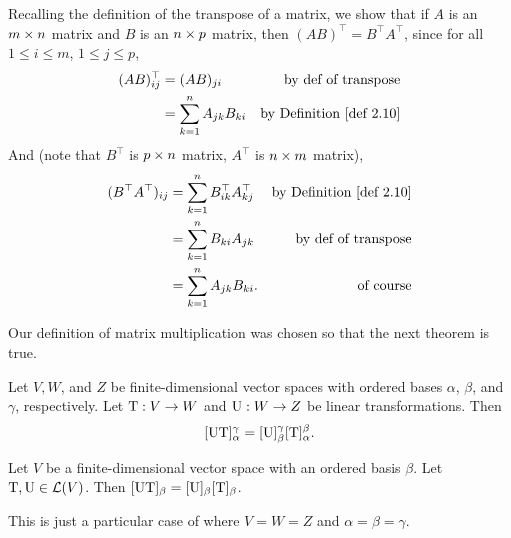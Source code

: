 \begin{additional theorem} \label{athm 2.24}
Recalling the definition of the transpose of a matrix, we show that if \(A\) is an \(m \times n\) matrix and \(B\) is an \(n \times p\) matrix, then \((AB)^\top = B^\top A^\top\), since for all \(1 \le i \le m\), \(1 \le j \le p\),
\begin{align*}
    (AB)^\top_{ij} & = (AB)_{ji} & \text{by def of transpose} \\
                   & = \sum_{k = 1}^n A_{jk} B_{ki} & \text{by \DEF{2.10}}
\end{align*}
And (note that \(B^\top\) is \(p \times n\) matrix, \(A^\top\) is \(n \times m\) matrix),
\begin{align*}
    (B^\top A^\top)_{ij} & = \sum_{k = 1}^n B^\top_{ik} A^\top_{kj} & \text{by \DEF{2.10}} \\
                         & = \sum_{k = 1}^n B_{ki} A_{jk} & \text{by def of transpose} \\
                         & = \sum_{k = 1}^n A_{jk} B_{ki}. & \text{of course}
\end{align*}
\end{additional theorem}

Our definition of matrix multiplication was chosen so that the next theorem is true.
\begin{theorem} \label{thm 2.11}
Let \(V, W\), and \(Z\) be finite-dimensional vector spaces with ordered bases \(\alpha\), \(\beta\), and \(\gamma\), respectively.
Let \(\mathrm{T} : V \to W\) and \(\mathrm{U} : W \to Z\) be linear transformations.
Then
\[
    [\mathrm{U}\mathrm{T}]_{\alpha}^{\gamma} = [\mathrm{U}]_{\beta}^{\gamma}[\mathrm{T}]_{\alpha}^{\beta}.
\]
\end{theorem}

\begin{corollary} \label{corollary 2.11.1}
Let \(V\) be a finite-dimensional vector space with an ordered
basis \(\beta\).
Let \(\mathrm{T}, \mathrm{U} \in \mathcal{L}(V)\).
Then \([\mathrm{U}\mathrm{T}]_{\beta} = [\mathrm{U}]_{\beta}[\mathrm{T}]_{\beta}\).

This is just a particular case of  where \(V = W = Z\) and \(\alpha = \beta = \gamma\).
\end{corollary}


